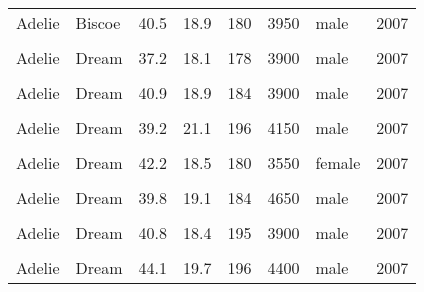 \documentclass[
  landscape]{article}
\begin{document}
\begin{longtable}[l]{llllllll}
Adelie & Biscoe & 40.5 & 18.9 & 180 & 3950 & male & 2007\\
\cellcolor{gray!15}{Adelie} & \cellcolor{gray!15}{Dream} & \cellcolor{gray!15}{39.5} & \cellcolor{gray!15}{16.7} & \cellcolor{gray!15}{178} & \cellcolor{gray!15}{3250} & \cellcolor{gray!15}{female} & \cellcolor{gray!15}{2007}\\
Adelie & Dream & 37.2 & 18.1 & 178 & 3900 & male & 2007\\
\cellcolor{gray!15}{Adelie} & \cellcolor{gray!15}{Dream} & \cellcolor{gray!15}{39.5} & \cellcolor{gray!15}{17.8} & \cellcolor{gray!15}{188} & \cellcolor{gray!15}{3300} & \cellcolor{gray!15}{female} & \cellcolor{gray!15}{2007}\\
Adelie & Dream & 40.9 & 18.9 & 184 & 3900 & male & 2007\\
\cellcolor{gray!15}{Adelie} & \cellcolor{gray!15}{Dream} & \cellcolor{gray!15}{36.4} & \cellcolor{gray!15}{17.0} & \cellcolor{gray!15}{195} & \cellcolor{gray!15}{3325} & \cellcolor{gray!15}{female} & \cellcolor{gray!15}{2007}\\
Adelie & Dream & 39.2 & 21.1 & 196 & 4150 & male & 2007\\
\cellcolor{gray!15}{Adelie} & \cellcolor{gray!15}{Dream} & \cellcolor{gray!15}{38.8} & \cellcolor{gray!15}{20.0} & \cellcolor{gray!15}{190} & \cellcolor{gray!15}{3950} & \cellcolor{gray!15}{male} & \cellcolor{gray!15}{2007}\\
Adelie & Dream & 42.2 & 18.5 & 180 & 3550 & female & 2007\\
\cellcolor{gray!15}{Adelie} & \cellcolor{gray!15}{Dream} & \cellcolor{gray!15}{37.6} & \cellcolor{gray!15}{19.3} & \cellcolor{gray!15}{181} & \cellcolor{gray!15}{3300} & \cellcolor{gray!15}{female} & \cellcolor{gray!15}{2007}\\
Adelie & Dream & 39.8 & 19.1 & 184 & 4650 & male & 2007\\
\cellcolor{gray!15}{Adelie} & \cellcolor{gray!15}{Dream} & \cellcolor{gray!15}{36.5} & \cellcolor{gray!15}{18.0} & \cellcolor{gray!15}{182} & \cellcolor{gray!15}{3150} & \cellcolor{gray!15}{female} & \cellcolor{gray!15}{2007}\\
Adelie & Dream & 40.8 & 18.4 & 195 & 3900 & male & 2007\\
\cellcolor{gray!15}{Adelie} & \cellcolor{gray!15}{Dream} & \cellcolor{gray!15}{36.0} & \cellcolor{gray!15}{18.5} & \cellcolor{gray!15}{186} & \cellcolor{gray!15}{3100} & \cellcolor{gray!15}{female} & \cellcolor{gray!15}{2007}\\
Adelie & Dream & 44.1 & 19.7 & 196 & 4400 & male & 2007\\

\end{longtable}
\end{document}
